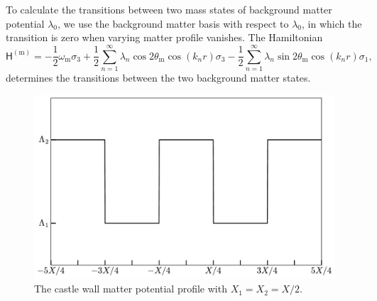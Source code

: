 To calculate the transitions between two mass states of background matter potential $\lambda_0$, we use the background matter basis with respect to $\lambda_0$, in which the transition is zero when varying matter profile vanishes. The Hamiltonian
\begin{equation}
\mathsf H^{(\mathrm m)} = - \frac{1}{2}\omega_{\mathrm m} \sigma_3  + \frac{1}{2} \sum_{n=1}^{\infty} \lambda_n \cos 2\theta_{\mathrm m} \cos\left( k_n  r \right)  \sigma_3 - \frac{1}{2} \sum_{n=1}^{\infty} \lambda_n \sin 2\theta_{\mathrm m}  \cos\left( k_n r \right) \sigma_1,
\label{castle-wall-decomposed-hamiltonian}
\end{equation}
determines the transitions between the two background matter states.


\begin{figure}[!htbp]
    \centering
    \includegraphics[width=\columnwidth]{chapters/assets/rabi/castlewall-profile}
    \caption{The castle wall matter potential profile with $X_1=X_2=X/2$.}
    \label{fig-castlewall-profile-illustration}
\end{figure}





